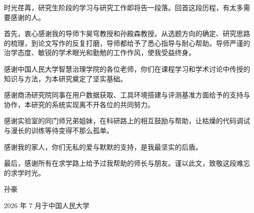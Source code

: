 \begin{acknowledge}
时光荏苒，研究生阶段的学习与研究工作即将告一段落。回首这段历程，有太多需要感谢的人。

首先，衷心感谢我的导师卞昊穹教授和孙殿森教授。从选题方向的确定、研究思路的梳理，到论文写作的反复打磨，导师都给予了悉心指导与耐心帮助。导师严谨的治学态度、敏锐的学术眼光和勤勉的工作作风，使我受益终身。

感谢中国人民大学智慧治理学院的各位老师，你们在课程学习和学术讨论中传授的知识与方法，为本研究奠定了坚实基础。

感谢商汤研究院同事在用户数据获取、工具环境搭建与评测基准方面给予的支持与协作，本研究的系统实现离不开各位的共同努力。

感谢实验室的同门师兄弟姐妹，在科研路上的相互鼓励与帮助，让枯燥的代码调试与漫长的训练等待变得不那么孤单。

感谢我的家人，你们无私的爱与默默的支持，是我最坚实的后盾。

最后，感谢所有在求学路上给予过我帮助的师长与朋友。谨以此文，致敬这段难忘的求学时光。

\hfill 孙豪

\hfill 2026 年 7 月于中国人民大学
\end{acknowledge}
